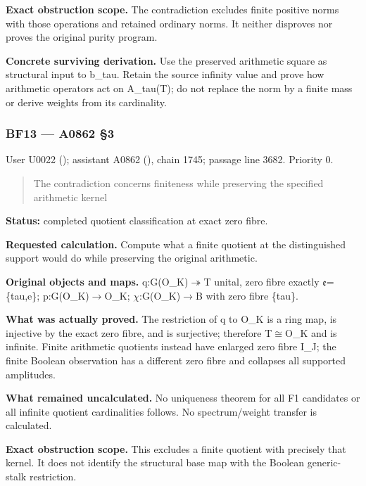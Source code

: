 \textbf{Exact obstruction scope.} The contradiction excludes finite
positive norms with those operations and retained ordinary norms. It
neither disproves nor proves the original purity program.

\textbf{Concrete surviving derivation.} Use the preserved arithmetic
square as structural input to b\_tau. Retain the source infinity value
and prove how arithmetic operators act on A\_tau(T); do not replace the
norm by a finite mass or derive weights from its cardinality.

\subsubsection{BF13 --- A0862 §3}\label{TranscriptLedgerStage:bf13-a0862-3}

User U0022 (\protect{});
assistant A0862 (\protect{}),
chain 1745; passage line 3682. Priority 0.

\begin{quote}
The contradiction concerns finiteness while preserving the specified
arithmetic kernel
\end{quote}

\textbf{Status:} completed quotient classification at exact zero fibre.

\textbf{Requested calculation.} Compute what a finite quotient at the
distinguished support would do while preserving the original arithmetic.

\textbf{Original objects and maps.}
q:G(O\_K)\allowbreak{}\ensuremath{↠}\allowbreak{}T unital, zero fibre
exactly \allowbreak{}\ensuremath{𝔢}\allowbreak{}=\{tau,e\};
p:G(O\_K)\allowbreak{}\ensuremath{→}\allowbreak{}O\_K;
\allowbreak{}\ensuremath{χ}\allowbreak{}:G(O\_K)\allowbreak{}\ensuremath{→}\allowbreak{}B
with zero fibre \{tau\}.

\textbf{What was actually proved.} The restriction of q to O\_K is a
ring map, is injective by the exact zero fibre, and is surjective;
therefore T\allowbreak{}\ensuremath{≅}\allowbreak{}O\_K and is infinite.
Finite arithmetic quotients instead have enlarged zero fibre I\_J; the
finite Boolean observation has a different zero fibre and collapses all
supported amplitudes.

\textbf{What remained uncalculated.} No uniqueness theorem for all F1
candidates or all infinite quotient cardinalities follows. No
spectrum/weight transfer is calculated.

\textbf{Exact obstruction scope.} This excludes a finite quotient with
precisely that kernel. It does not identify the structural base map with
the Boolean generic-stalk restriction.


